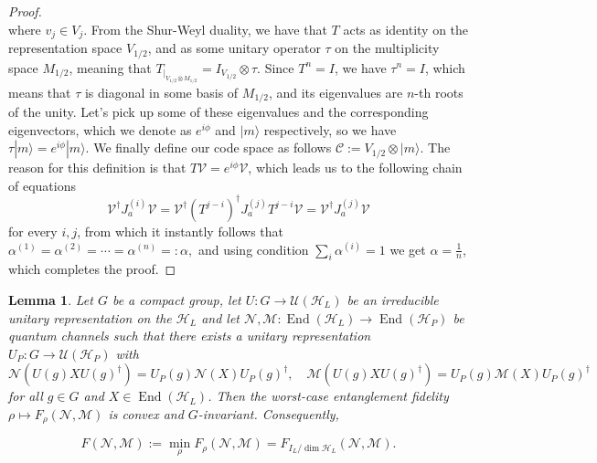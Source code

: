 \documentclass[10pt,twocolumn,superscriptaddress,aps,amsmath,amssymb,citeautoscript,floatfix,prx]{revtex4-2}
\theoremstyle{plain}
\theoremstyle{plain}
\theoremstyle{plain}
\theoremstyle{plain}
\theoremstyle{plain}
\theoremstyle{plain}
\theoremstyle{plain}
\newtheorem{smlemma}[smtheorem]{Lemma}
\theoremstyle{definition}
\theoremstyle{plain}
\begin{document}
\begin{appendix}
\begin{proof}
\[    \]
    where $v_j \in V_j$. From the Shur-Weyl duality, we have that $T$ acts as identity on the representation space $V_{1 / 2}$,
     and as some unitary operator $\tau$ on the multiplicity space $M_{1 / 2}$, meaning that
    $
        T_{|_{V_{1 / 2} \otimes M_{1 / 2}}}=I_{V_{1 / 2}} \otimes \tau.
    $
        Since $T^n=I$, we have $\tau^n=I$, which means that $\tau$ is diagonal in some basis of $M_{1 / 2}$, and its eigenvalues are $n$-th roots of the unity. Let's pick up
        some of these eigenvalues and the corresponding eigenvectors, which we denote as $e^{i \phi}$ and $|m\rangle$ respectively, so we have
    $
        \tau|m\rangle=e^{i \phi}|m\rangle .
    $
     We finally define our code space as follows
    $
        \mathcal{C}:=V_{1 / 2} \otimes|m\rangle.
    $
    The reason for this definition is that $T \mathcal{V}=e^{i \phi} \mathcal{V}$, which leads us to
    the following chain of equations
    \[
        \mathcal{V}^{\dagger} J_a^{(i)} \mathcal{V}=\mathcal{V}^{\dagger} (T^{j-i})^{\dagger} J_a^{(j)} T^{j-i} \mathcal{V}=\mathcal{V}^{\dagger} J_a^{(j)} \mathcal{V}
    \]
    for every $i,j$, from which it instantly follows that
    $
        \alpha^{(1)}=\alpha^{(2)}=\cdots=\alpha^{(n)}=: \alpha,
    $
    and using condition $\sum_i\alpha^{(i)}=1$ we get $\alpha=\frac{1}{n}$, which completes the proof.
\end{proof}

\begin{smlemma}\label{fidelity_opt}
Let $G$ be a compact group, let
$
U: G \rightarrow \mathcal{U}\left(\mathcal{H}_{L}\right)
$
be an irreducible unitary representation on the $\mathcal{H}_{L}$ and let
$
\mathcal{N}, \mathcal{M}: \operatorname{End}\left(\mathcal{H}_L\right) \rightarrow \operatorname{End}\left(\mathcal{H}_{P}\right)
$
be quantum channels such that there exists a unitary representation
$
U_P: G \rightarrow \mathcal{U}\left(\mathcal{H}_{P}\right)
$
with
\begin{equation}\label{eq:channel_covar}
    \mathcal{N}\left(U(g) X U(g)^{\dagger}\right)=U_P(g) \mathcal{N}(X) U_P(g)^{\dagger}, \quad \mathcal{M}\left(U(g) X U(g)^{\dagger}\right)=U_P(g) \mathcal{M}(X) U_P(g)^{\dagger}
\end{equation}
for all $g \in G$ and $X \in \operatorname{End}\left(\mathcal{H}_{L}\right)$.
Then the worst-case entanglement fidelity
$
\rho \longmapsto F_\rho(\mathcal{N}, \mathcal{M})
$
is convex and $G$-invariant. Consequently,

$$
F(\mathcal{N}, \mathcal{M}):=\min _\rho F_\rho(\mathcal{N}, \mathcal{M})=F_{I_{L} / \operatorname{dim} \mathcal{H}_{L}}(\mathcal{N}, \mathcal{M}) .
$$
\end{smlemma}


\end{appendix}
\end{document}
